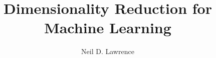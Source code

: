 \documentclass{book}
\begin{document}
\title{Dimensionality Reduction for Machine Learning}

\author{Neil D. Lawrence}

\maketitle

\tableofcontents{}







%

%
%


\printglossaries
\appendix





\end{document}
